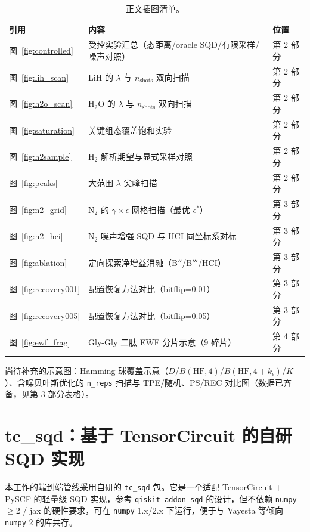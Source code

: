 \documentclass[UTF8,12pt,a4paper]{ctexart}
\newcommand{\Htwo}{H$_2$}
\newcommand{\HtwoO}{H$_2$O}
\newcommand{\Ntwo}{N$_2$}
\begin{document}
\begin{table}[H]
\centering
\caption{正文插图清单。}
\begin{tabular}{p{2.2cm}p{8.3cm}l}
\toprule
引用 & 内容 & 位置 \\
\midrule
图~\ref{fig:controlled} & 受控实验汇总（态距离/oracle SQD/有限采样/噪声对照） & 第 2 部分 \\
图~\ref{fig:lih_scan} & LiH 的 $\lambda$ 与 $n_{\text{shots}}$ 双向扫描 & 第 2 部分 \\
图~\ref{fig:h2o_scan} & \HtwoO{} 的 $\lambda$ 与 $n_{\text{shots}}$ 双向扫描 & 第 2 部分 \\
图~\ref{fig:saturation} & 关键组态覆盖饱和实验 & 第 2 部分 \\
图~\ref{fig:h2sample} & \Htwo{} 解析期望与显式采样对照 & 第 2 部分 \\
图~\ref{fig:peaks} & 大范围 $\lambda$ 尖峰扫描 & 第 2 部分 \\
图~\ref{fig:n2_grid} & \Ntwo{} 的 $\gamma\times\epsilon$ 网格扫描（最优 $\epsilon^*$） & 第 3 部分 \\
图~\ref{fig:n2_hci} & \Ntwo{} 噪声增强 SQD 与 HCI 同坐标系对标 & 第 3 部分 \\
图~\ref{fig:ablation} & 定向探索净增益消融（B$''$/B$'''$/HCI） & 第 3 部分 \\
图~\ref{fig:recovery001} & 配置恢复方法对比（bitflip=0.01） & 第 3 部分 \\
图~\ref{fig:recovery005} & 配置恢复方法对比（bitflip=0.05） & 第 3 部分 \\
图~\ref{fig:ewf_frag} & Gly-Gly 二肽 EWF 分片示意（9 碎片） & 第 4 部分 \\
\bottomrule
\end{tabular}
\end{table}

尚待补充的示意图：Hamming 球覆盖示意（$D$/$B(\text{HF},4)$/$B(\text{HF},4{+}k_\epsilon)$/$K$）、含噪贝叶斯优化的 \texttt{n\_reps} 扫描与 TPE/随机、PS/REC 对比图（数据已齐备，见第 3 部分表格）。

\section{tc\_sqd：基于 TensorCircuit 的自研 SQD 实现}

本工作的端到端管线采用自研的 \texttt{tc\_sqd} 包。它是一个适配 TensorCircuit + PySCF 的轻量级 SQD 实现，参考 \texttt{qiskit-addon-sqd} 的设计，但不依赖 \texttt{numpy}$\ge$2 / jax 的硬性要求，可在 \texttt{numpy} 1.x/2.x 下运行，便于与 Vayesta 等倾向 \texttt{numpy} 2 的库共存。
\end{document}
